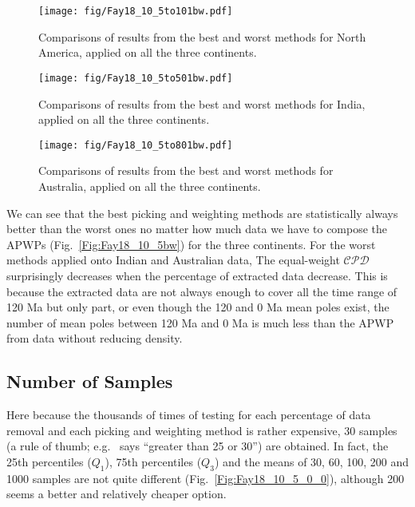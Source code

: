 \begin{figure}
    \centering
        \texttt{[image: fig/Fay18\_10\_5to101bw.pdf]}
    \captionsetup{width=.95\textwidth}
    \caption{Comparisons of results from the best and worst methods for North
	America, applied on all the three continents.}\label{Fig:Fay18_10_5to101bw}
\end{figure}

\begin{figure}
    \centering
        \texttt{[image: fig/Fay18\_10\_5to501bw.pdf]}
    \captionsetup{width=.95\textwidth}
    \caption{Comparisons of results from the best and worst methods for India,
	applied on all the three continents.}\label{Fig:Fay18_10_5to501bw}
\end{figure}

\begin{figure}
    \centering
        \texttt{[image: fig/Fay18\_10\_5to801bw.pdf]}
    \captionsetup{width=.95\textwidth}
    \caption{Comparisons of results from the best and worst methods for
	Australia, applied on all the three continents.}\label{Fig:Fay18_10_5to801bw}
\end{figure}

We can see that the best picking and weighting methods are statistically always
better than the worst ones no matter how much data we have to compose the APWPs
(Fig.~\ref{Fig:Fay18_10_5bw}) for the three continents. For the worst methods
applied onto Indian and Australian data, The equal-weight $\mathcal{CPD}$
surprisingly decreases when the percentage of extracted data decrease. This is
because the extracted data are not always enough to cover all the time range of
120 Ma but only part, or even though the 120 and 0 Ma mean poles
exist, the number of mean poles between 120 Ma and 0 Ma is much less than the
APWP from data without reducing density.

\subsection{Number of Samples}
Here because the thousands of times of testing for each percentage of data
removal and each picking and weighting method is rather expensive, 30 samples
(a rule of thumb; e.g.~\cite{H19} says ``greater than 25 or 30'') are obtained.
In fact, the 25th percentiles ($Q_1$), 75th percentiles ($Q_3$) and the means of
30, 60, 100, 200 and 1000 samples are not quite different
(Fig.~\ref{Fig:Fay18_10_5_0_0}), although 200 seems a better and relatively
cheaper option.

